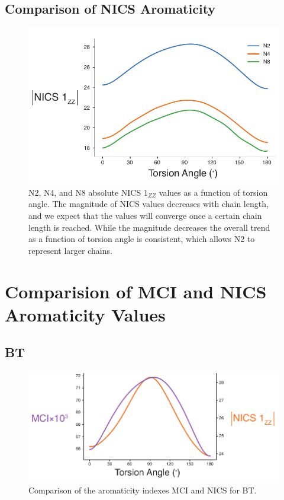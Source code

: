 \clearpage
\subsection{Comparison of NICS Aromaticity}
\begin{figure}[hbt!]
    \centering
    \includegraphics{figures/append_aroma/p_NICS_compare_copy.pdf}
    \caption[Aromaticity of Different Length Thiophene Oligomers ]{N2, N4, and N8 absolute NICS $1_{ZZ}$ values as a function of torsion angle. The magnitude of NICS values decreases with chain length, and we expect that the values will converge once a certain chain length is reached. While the magnitude decreases the overall trend as a function of torsion angle is consistent, which allows N2 to represent larger chains.}
    \label{fig:p_NICS_compare}
\end{figure}

\clearpage
\section{Comparision of MCI and NICS Aromaticity Values}\label{sec:aroma_mci_nics_comp}

\subsection{BT}
\begin{figure}[hbt!]
    \centering
    \includegraphics{figures/append_aroma/pt_aroma_compare_copy.pdf}
    \caption[Comparison of the Aromaticity Indexes MCI and NICS for BT]{Comparison of the aromaticity indexes MCI and NICS for BT.}
    \label{fig:pt_aroma_compare}
\end{figure}

